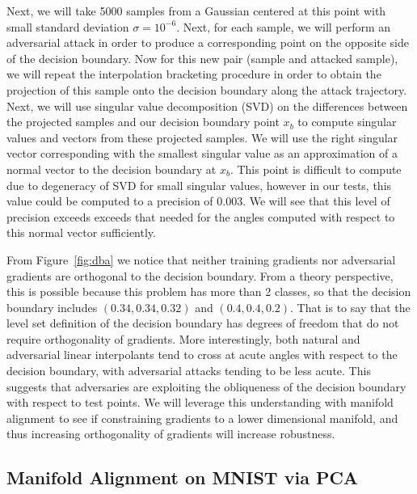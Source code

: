 Next, we will take 5000 samples from a Gaussian centered at this point with small standard deviation $\sigma = 10^{-6}$. Next, for each sample, we will perform an adversarial attack in order to produce a corresponding point on the opposite side of the decision boundary. Now for this new pair (sample and attacked sample), we will repeat the interpolation bracketing procedure in order to obtain the projection of this sample onto the decision boundary along the attack trajectory. Next, we will use singular value decomposition (SVD) on the differences between the projected samples and our decision boundary point $x_b$  to compute singular values and vectors from these projected samples. We will use the right singular vector corresponding with the smallest singular value as an approximation of a normal vector to the decision boundary at $x_b$. This point is difficult to compute due to degeneracy of SVD for small singular values, however in our tests, this value could be computed to a precision of 0.003. We will see that this level of precision exceeds exceeds that needed for the angles computed with respect to this normal vector sufficiently. 

From Figure~\ref{fig:dba} we notice that neither training gradients nor adversarial gradients are orthogonal to the decision boundary. From a theory perspective, this is possible because this problem has more than 2 classes, so that the decision boundary includes $(0.34, 0.34, 0.32)$ and $(0.4, 0.4, 0.2)$. That is to say that the level set definition of the decision boundary has degrees of freedom that do not require orthogonality of gradients. More interestingly, both natural and adversarial linear interpolants tend to cross at acute angles with respect to the decision boundary, with adversarial attacks tending to be less acute. This suggests that adversaries are exploiting the obliqueness of the decision boundary with respect to test points. We will leverage this understanding with manifold alignment to see if constraining gradients to a lower dimensional manifold, and thus increasing orthogonality of gradients will increase robustness. 

\subsection{Manifold Alignment on MNIST via PCA} \label{subsec:mae}

